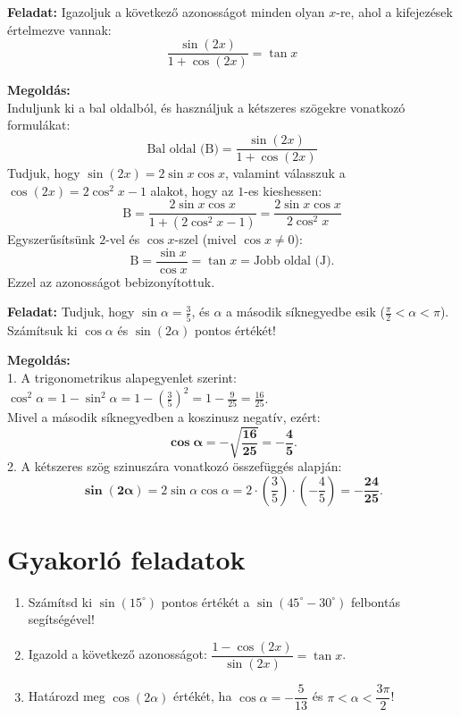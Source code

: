 \documentclass[11pt,a4paper]{article}
\begin{document}
\begin{pelda}
\textbf{Feladat:} Igazoljuk a következő azonosságot minden olyan $x$-re, ahol a kifejezések értelmezve vannak:
\[
\frac{\sin(2x)}{1 + \cos(2x)} = \tan x
\]

\textbf{Megoldás:}\\
Induljunk ki a bal oldalból, és használjuk a kétszeres szögekre vonatkozó formulákat:
\[
\text{Bal oldal (B)} = \frac{\sin(2x)}{1 + \cos(2x)}
\]
Tudjuk, hogy $\sin(2x) = 2\sin x \cos x$, valamint válasszuk a $\cos(2x) = 2\cos^2 x - 1$ alakot, hogy az $1$-es kieshessen:
\[
\text{B} = \frac{2\sin x \cos x}{1 + (2\cos^2 x - 1)} = \frac{2\sin x \cos x}{2\cos^2 x}
\]
Egyszerűsítsünk $2$-vel és $\cos x$-szel (mivel $\cos x \neq 0$):
\[
\text{B} = \frac{\sin x}{\cos x} = \tan x = \text{Jobb oldal (J)}.
\]
Ezzel az azonosságot bebizonyítottuk.
\end{pelda}

\begin{pelda}
\textbf{Feladat:} Tudjuk, hogy $\sin\alpha = \frac{3}{5}$, és $\alpha$ a második síknegyedbe esik ($\frac{\pi}{2} < \alpha < \pi$). Számítsuk ki $\cos\alpha$ és $\sin(2\alpha)$ pontos értékét!

\textbf{Megoldás:}\\
1. A trigonometrikus alapegyenlet szerint: $\cos^2\alpha = 1 - \sin^2\alpha = 1 - \left(\frac{3}{5}\right)^2 = 1 - \frac{9}{25} = \frac{16}{25}$.\\
Mivel a második síknegyedben a koszinusz negatív, ezért:
\[
\mathbf{\cos\alpha = -\sqrt{\frac{16}{25}} = -\frac{4}{5}}.
\]
2. A kétszeres szög szinuszára vonatkozó összefüggés alapján:
\[
\mathbf{\sin(2\alpha)} = 2\sin\alpha\cos\alpha = 2 \cdot \left(\frac{3}{5}\right) \cdot \left(-\frac{4}{5}\right) = \mathbf{-\frac{24}{25}}.
\]
\end{pelda}

\vspace{1mm}

\section{Gyakorló feladatok}

\begin{enumerate}[itemsep=2mm]
    \item Számítsd ki $\sin(15^\circ)$ pontos értékét a $\sin(45^\circ - 30^\circ)$ felbontás segítségével!
    \item Igazold a következő azonosságot: $\dfrac{1 - \cos(2x)}{\sin(2x)} = \tan x$.
    \item Határozd meg $\cos(2\alpha)$ értékét, ha $\cos\alpha = -\dfrac{5}{13}$ és $\pi < \alpha < \dfrac{3\pi}{2}$!
\end{enumerate}
\end{document}

